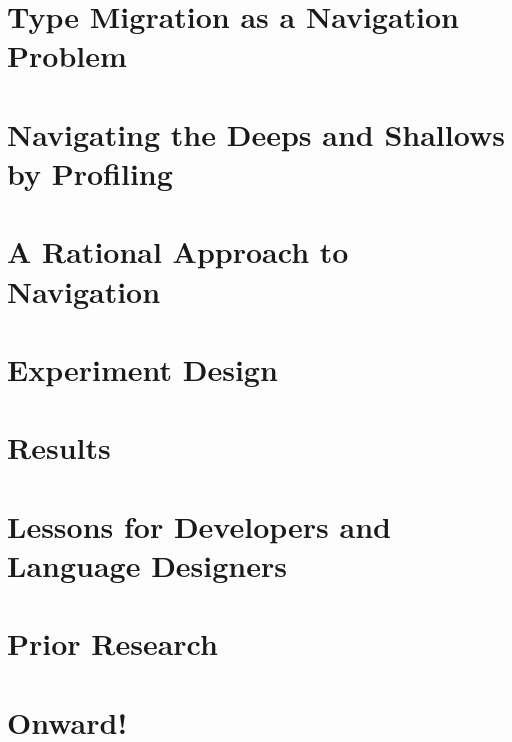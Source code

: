 \documentclass[acmsmall,review,screen]{acmart}
\begin{document}
\def\sec#1#2{\section{#2} \label{sec:#1} }

\sec{intro}       {Type Migration as a Navigation Problem}
\sec{seascape}    {Navigating the Deeps and Shallows by Profiling}
\sec{ideas}       {A Rational Approach to Navigation}
\sec{experiment}  {Experiment Design}
\sec{results}     {Results}
\sec{discussion}  {Lessons for Developers and Language Designers}
\sec{related}     {Prior Research}
\sec{conclusion}  {Onward!}



\ifappendix{\appendix }{}
\clearpage



\end{document}

